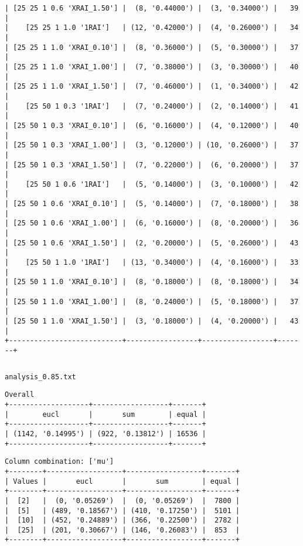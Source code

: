 \documentclass{article}
\begin{document}
\begin{verbatim}
| [25 25 1 0.6 'XRAI_1.50'] |  (8, '0.44000') |  (3, '0.34000') |   39  |
|    [25 25 1 1.0 '1RAI']   | (12, '0.42000') |  (4, '0.26000') |   34  |
| [25 25 1 1.0 'XRAI_0.10'] |  (8, '0.36000') |  (5, '0.30000') |   37  |
| [25 25 1 1.0 'XRAI_1.00'] |  (7, '0.38000') |  (3, '0.30000') |   40  |
| [25 25 1 1.0 'XRAI_1.50'] |  (7, '0.46000') |  (1, '0.34000') |   42  |
|    [25 50 1 0.3 '1RAI']   |  (7, '0.24000') |  (2, '0.14000') |   41  |
| [25 50 1 0.3 'XRAI_0.10'] |  (6, '0.16000') |  (4, '0.12000') |   40  |
| [25 50 1 0.3 'XRAI_1.00'] |  (3, '0.12000') | (10, '0.26000') |   37  |
| [25 50 1 0.3 'XRAI_1.50'] |  (7, '0.22000') |  (6, '0.20000') |   37  |
|    [25 50 1 0.6 '1RAI']   |  (5, '0.14000') |  (3, '0.10000') |   42  |
| [25 50 1 0.6 'XRAI_0.10'] |  (5, '0.14000') |  (7, '0.18000') |   38  |
| [25 50 1 0.6 'XRAI_1.00'] |  (6, '0.16000') |  (8, '0.20000') |   36  |
| [25 50 1 0.6 'XRAI_1.50'] |  (2, '0.20000') |  (5, '0.26000') |   43  |
|    [25 50 1 1.0 '1RAI']   | (13, '0.34000') |  (4, '0.16000') |   33  |
| [25 50 1 1.0 'XRAI_0.10'] |  (8, '0.18000') |  (8, '0.18000') |   34  |
| [25 50 1 1.0 'XRAI_1.00'] |  (8, '0.24000') |  (5, '0.18000') |   37  |
| [25 50 1 1.0 'XRAI_1.50'] |  (3, '0.18000') |  (4, '0.20000') |   43  |
+---------------------------+-----------------+-----------------+-------+
\end{verbatim}

\begin{verbatim}

\end{verbatim}

\newpage
\verb|analysis_0.85.txt|
\begin{verbatim}
Overall
+-------------------+------------------+-------+
|        eucl       |       sum        | equal |
+-------------------+------------------+-------+
| (1142, '0.14995') | (922, '0.13812') | 16536 |
+-------------------+------------------+-------+
\end{verbatim}

\begin{verbatim}
Column combination: ['mu']
+--------+------------------+------------------+-------+
| Values |       eucl       |       sum        | equal |
+--------+------------------+------------------+-------+
|  [2]   |  (0, '0.05269')  |  (0, '0.05269')  |  7800 |
|  [5]   | (489, '0.18567') | (410, '0.17250') |  5101 |
|  [10]  | (452, '0.24889') | (366, '0.22500') |  2782 |
|  [25]  | (201, '0.30667') | (146, '0.26083') |  853  |
+--------+------------------+------------------+-------+
\end{verbatim}
\end{document}
